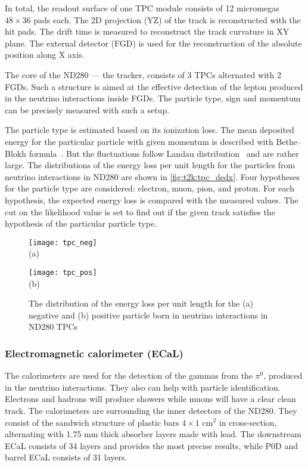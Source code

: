 \documentclass[../main.tex]{subfiles}
\begin{document}
In total, the readout surface of one TPC module consists of 12 micromegas $48\times36$ pads each. The 2D projection (YZ) of the track is reconstructed with the hit pads. The drift time is measured to reconstruct the track curvature in XY plane. The external detector (FGD) is used for the reconstruction of the absolute position along X axis.

The core of the ND280 --- the tracker, consists of 3 TPCs alternated with 2 FGDs. Such a structure is aimed at the effective detection of the lepton produced in the neutrino interactions inside FGDs. The particle type, sign and momentum can be precisely measured with such a setup.

The particle type is estimated based on its ionization loss. The mean deposited energy  for the particular particle with given momentum is described with Bethe--Blokh formula~\cite{Bethe1930}. But the fluctuations follow Landau distribution~\cite{Landau1944} and are rather large. The distributions of the energy loss per unit length for the particles from neutrino interactions in ND280 are shown in \autoref{fig:t2k:tpc_dedx}. Four hypotheses for the particle type are considered: electron, muon, pion, and proton. For each hypothesis, the expected energy loss is compared with the measured values. The cut on the likelihood value is set to find out if the given track satisfies the hypothesis of the particular particle type.

\begin{figure}[!ht]
  \centering
  \begin{minipage}{0.49\linewidth}
    \centering
    \texttt{[image: tpc\_neg]} \\ (a)
  \end{minipage}
  \begin{minipage}{0.49\linewidth}
    \centering
    \texttt{[image: tpc\_pos]} \\ (b)
  \end{minipage}
  \caption{The distribution of the energy loss per unit length for the (a) negative and (b) positive particle born in neutrino interactions in ND280 TPCs}
  \label{fig:t2k:tpc_dedx}
\end{figure}

\subsubsection{Electromagnetic calorimeter (ECaL)}
The calorimeters are used for the detection of the gammas from the $\pi^0$, produced in the neutrino interactions. They also can help with particle identification. Electrons and hadrons will produce showers while muons will have a clear clean track. The calorimeters are surrounding the inner detectors of the ND280. They consist of the sandwich structure of plastic bars $4\times1$ $\text{cm}^2$ in cross-section, alternating with 1.75 mm thick absorber layers made with lead. The downstream ECaL consists of 34 layers and provides the most precise results, while P0D and barrel ECaL consists of 31 layers.
\end{document}
